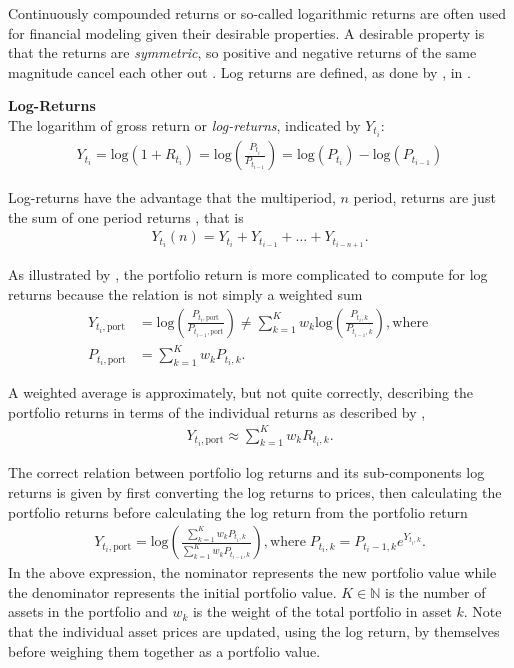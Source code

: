 Continuously compounded returns or so-called logarithmic returns are often used for financial modeling given their desirable properties. A desirable property is that the returns are \emph{symmetric}, so positive and negative returns of the same magnitude cancel each other out \citet[p.~4]{Danielsson2011}. Log returns are defined, as done by \citet[p.~3]{Danielsson2011}, in . 

\begin{definition}\label{def:logReturns}
    \textbf{Log-Returns} \\
    The logarithm of gross return or \emph{log-returns}, indicated by $Y_{t_i}$:
    \begin{align*}
        Y_{t_i} = \mathrm{log}(1+R_{t_i}) = \mathrm{log} \left(\frac{P_{t_i}}{P_{t_{i-1}}}\right) = \mathrm{log}(P_{t_{i}}) -\mathrm{log}(P_{t_{i-1}})
    \end{align*}
\end{definition}

Log-returns have the advantage that the multiperiod, $n$ period, returns are just the sum of one period returns \citet[p.~3]{Danielsson2011}, that is 
\begin{align*}
    Y_{t_i}(n) = Y_{t_i}+Y_{t_{i-1}} + \dots + Y_{t_{i-n+1}}.
\end{align*}

 
As illustrated by \citet[p.~4]{Danielsson2011}, the portfolio return is more complicated to compute for log returns because the relation is not simply a weighted sum
\begin{align*}
        Y_{t_i,\mathrm{port}} &= \mathrm{log}\left(\frac{P_{t_i,\mathrm{port}}}{P_{t_{i-1},\mathrm{port}}}\right) \neq  \sum_{k=1}^K w_k\mathrm{log}\left(\frac{P_{t_i,k}}{P_{t_{i-1},k}}\right), \mathrm{where} \;\\
        P_{t_i,\mathrm{port}} &= \sum_{k=1}^K w_k P_{t_i,k}.
\end{align*}


A weighted average is approximately, but not quite correctly, describing the portfolio returns in terms of the individual returns as described by \citet[p.~3]{Danielsson2011},
\begin{align*}
    Y_{t_i,\mathrm{port}} \approx \sum_{k=1}^K w_k R_{t_i,k}.
\end{align*}

The correct relation between portfolio log returns and its sub-components log returns is given by first converting the log returns to prices, then calculating the portfolio returns before calculating the log return from the portfolio return
\begin{align*}
    Y_{t_i,\mathrm{port}} = \mathrm{log} \left( \frac{\sum_{k=1}^K w_k P_{t_i,k}}{\sum_{k=1}^K w_k P_{t_{i-1},k}}\right), \mathrm{where} \; P_{t_i,k} = P_{t_i-1,k}e^{Y_{t_i,k}}.
\end{align*}
In the above expression, the nominator represents the new portfolio value while the denominator represents the initial portfolio value. $K\in \mathbb{N}$ is the number of assets in the portfolio and $w_k$ is the weight of the total portfolio in asset $k$. Note that the individual asset prices are updated, using the log return, by themselves before weighing them together as a portfolio value. 

